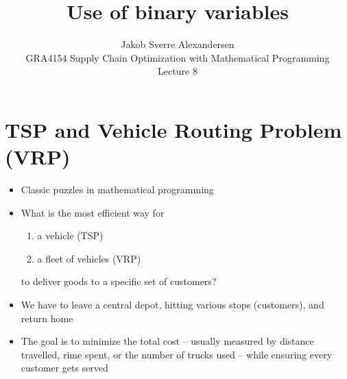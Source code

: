\documentclass[10pt]{article}
\begin{document}
 
\title{Use of binary variables}
\author{Jakob Sverre Alexandersen\\
GRA4154 Supply Chain Optimization with Mathematical Programming\\
Lecture 8}
\maketitle

\tableofcontents
\newpage

\section{TSP and Vehicle Routing Problem (VRP)}
\begin{itemize}
    \item Classic puzzles in mathematical programming 
    \item What is the most efficient way for 
    \begin{enumerate}
        \item a vehicle (TSP)
        \item a fleet of vehicles (VRP)
    \end{enumerate}
    to deliver goods to a specific set of customers?
    \item We have to leave a central depot, hitting various stops (customers), and return home
    \item The goal is to minimize the total cost -- usually measured by distance travelled, rime spent, or the number of trucks used -- while ensuring every customer gets served 
\end{itemize}
\end{document}
